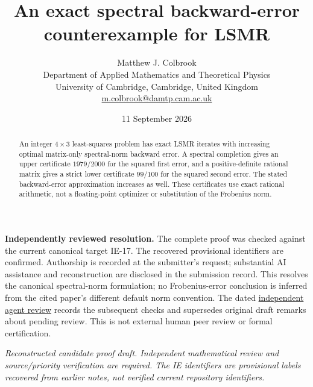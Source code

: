 \documentclass[11pt]{article}
\title{An exact spectral backward-error counterexample for LSMR}
\author{Matthew J. Colbrook\\\small Department of Applied Mathematics and Theoretical Physics\\\small University of Cambridge, Cambridge, United Kingdom\\\small\href{mailto:m.colbrook@damtp.cam.ac.uk}{m.colbrook@damtp.cam.ac.uk}}
\date{11 September 2026}
\begin{document}
\maketitle

\noindent\textbf{Independently reviewed resolution.} The complete proof was checked against the current canonical target IE-17. The recovered provisional identifiers are confirmed. Authorship is recorded at the submitter's request; substantial AI assistance and reconstruction are disclosed in the submission record. This resolves the canonical spectral-norm formulation; no Frobenius-error conclusion is inferred from the cited paper's different default norm convention.
The dated \href{https://github.com/MColbrook/OpenProblemsInNLA/blob/codex/colbrook-recovered-submissions/references/colbrook-recovered-2026-09-11/verification/reviews/IE-17-review.md}{independent agent review} records the subsequent checks and supersedes original draft remarks about pending review. This is not external human peer review or formal certification.
\par\medskip

\noindent\textit{Reconstructed candidate proof draft. Independent mathematical review and source/priority verification are required. The IE identifiers are provisional labels recovered from earlier notes, not verified current repository identifiers.}


\begin{abstract}
An integer $4\times3$ least-squares problem has exact LSMR iterates with increasing optimal matrix-only spectral-norm backward error. A spectral completion gives an upper certificate $1979/2000$ for the squared first error, and a positive-definite rational matrix gives a strict lower certificate $99/100$ for the squared second error. The stated backward-error approximation increases as well. These certificates use exact rational arithmetic, not a floating-point optimizer or substitution of the Frobenius norm.
\end{abstract}
\end{document}
